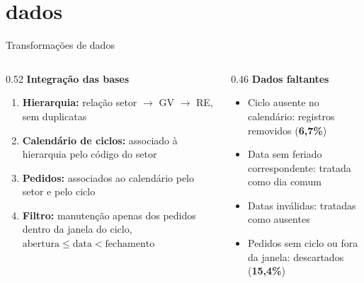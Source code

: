 \documentclass[aspectratio=169,11pt]{beamer}
\begin{document}
\section{dados}


\begin{frame}{Transformações de dados}
\begin{columns}[T]

\begin{column}{0.52\textwidth}
\textbf{Integração das bases}
\begin{enumerate}
  \item \textbf{Hierarquia:} relação setor $\rightarrow$ GV $\rightarrow$ RE, sem duplicatas
  \item \textbf{Calendário de ciclos:} associado à hierarquia pelo código do setor
  \item \textbf{Pedidos:} associados ao calendário pelo setor e pelo ciclo
  \item \textbf{Filtro:} manutenção apenas dos pedidos dentro da janela do ciclo, $\text{abertura} \le \text{data} < \text{fechamento}$
\end{enumerate}
\end{column}

\begin{column}{0.46\textwidth}
    \textbf{Dados faltantes}
    \begin{itemize}
      \item Ciclo ausente no calendário: registros removidos (\textbf{6,7\%})
      \item Data sem feriado correspondente: tratada como dia comum
      \item Datas inválidas: tratadas como ausentes
      \item Pedidos sem ciclo ou fora da janela: descartados (\textbf{15,4\%})
    \end{itemize}
\end{column}

\end{columns}
\end{frame}
\end{document}
